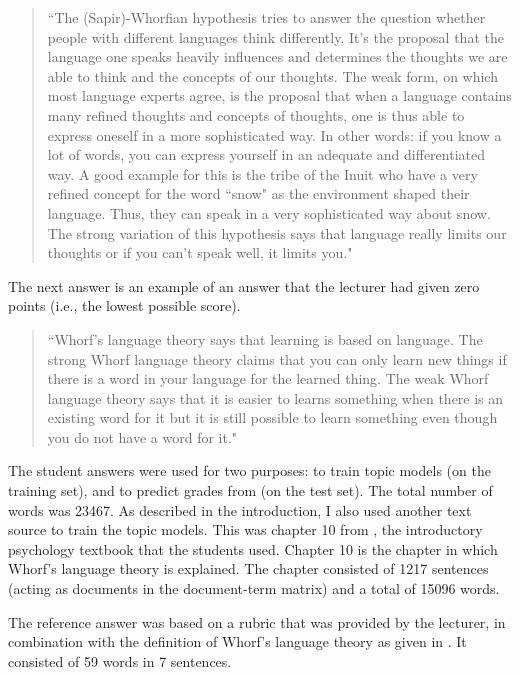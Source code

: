 \documentclass[a4paper,10pt,twoside]{article}
\begin{document}
\begin{quote}
``The (Sapir)-Whorfian hypothesis tries to answer the question whether people with different languages think differently. It's the proposal that the language one speaks heavily influences and determines the thoughts we are able to think and the concepts of our thoughts. The weak form, on which most language experts agree, is the proposal that when a language contains many refined thoughts and concepts of thoughts, one is thus able to express oneself in a more sophisticated way. In other words: if you know a lot of words, you can express yourself in an adequate and differentiated way. A good example for this is the tribe of the Inuit who have a very refined concept for the word ``snow" as the environment shaped their language. Thus, they can speak in a very sophisticated way about snow. The strong variation of this hypothesis says that language really limits our thoughts or if you can't speak well, it limits you."
\end{quote}

The next answer is an example of an answer that the lecturer had given zero points (i.e., the lowest possible score).

\begin{quote}
	``Whorf's language theory says that learning is based on language. The strong Whorf language theory claims that you can only learn new things if there is a word in your language for the learned thing. The weak Whorf language theory says that it is easier to learns something when there is an existing word for it but it is still possible to learn something even though you do not have a word for it."
\end{quote}

The student answers were used for two purposes: to train topic models (on the training set), and to predict grades from (on the test set). The total number of words was 23467. As described in the introduction, I also used another text source to train the topic models. This was chapter 10 from , the introductory psychology textbook that the students used. Chapter 10 is the chapter in which Whorf's language theory is explained. The chapter consisted of 1217 sentences (acting as documents in the document-term matrix) and a total of 15096 words.

The reference answer was based on a rubric that was provided by the lecturer, in combination with the definition of Whorf's language theory as given in . It consisted of 59 words in 7 sentences.
\end{document}
